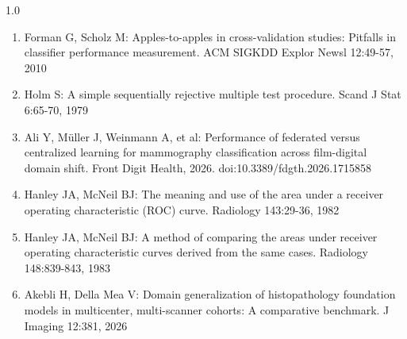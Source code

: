 \documentclass[11pt,a4paper]{article}
\begin{document}
\begin{spacing}{1.0}
\begin{enumerate}
\item Forman G, Scholz M: Apples-to-apples in cross-validation studies: Pitfalls in classifier performance measurement. ACM SIGKDD Explor Newsl 12:49-57, 2010
\item Holm S: A simple sequentially rejective multiple test procedure. Scand J Stat 6:65-70, 1979
\item Ali Y, M\"uller J, Weinmann A, et al: Performance of federated versus centralized learning for mammography classification across film-digital domain shift. Front Digit Health, 2026. doi:10.3389/fdgth.2026.1715858
\item Hanley JA, McNeil BJ: The meaning and use of the area under a receiver operating characteristic (ROC) curve. Radiology 143:29-36, 1982
\item Hanley JA, McNeil BJ: A method of comparing the areas under receiver operating characteristic curves derived from the same cases. Radiology 148:839-843, 1983
\item Akebli H, Della Mea V: Domain generalization of histopathology foundation models in multicenter, multi-scanner cohorts: A comparative benchmark. J Imaging 12:381, 2026
\end{enumerate}
\end{spacing}
\clearpage
\end{document}
